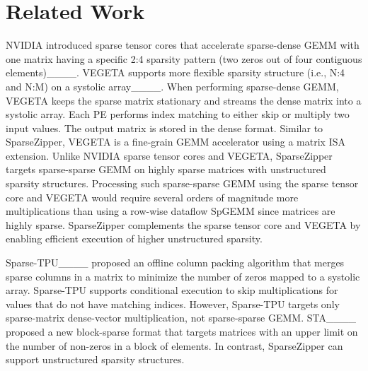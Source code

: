 \section{Related Work}
\label{sec-spz-related-work}

NVIDIA introduced sparse tensor cores that accelerate sparse-dense GEMM with
one matrix having a specific 2:4 sparsity pattern (two zeros out of four
contiguous
elements)____.
VEGETA supports more flexible sparsity structure (i.e., N:4 and N:M) on a
systolic array____.
When performing sparse-dense GEMM, VEGETA keeps the sparse matrix stationary
and streams the dense matrix into a systolic array.
Each PE performs index matching to either skip or multiply two input values.
The output matrix is stored in the dense format.
Similar to SparseZipper, VEGETA is a fine-grain GEMM accelerator using a matrix
ISA extension.
Unlike NVIDIA sparse tensor cores and VEGETA, SparseZipper targets sparse-sparse
GEMM on highly sparse matrices with unstructured sparsity structures.
Processing such sparse-sparse GEMM using the sparse tensor core and VEGETA
would require several orders of magnitude more multiplications than using a
row-wise dataflow SpGEMM since matrices are highly sparse.
SparseZipper complements the sparse tensor core and VEGETA by enabling efficient execution of higher unstructured sparsity.


Sparse-TPU____ proposed an offline column packing
algorithm that merges sparse columns in a matrix to minimize the number of
zeros mapped to a systolic array.
Sparse-TPU supports conditional execution to skip multiplications for values
that do not have matching indices.
However, Sparse-TPU targets only sparse-matrix dense-vector multiplication, not
sparse-sparse GEMM.
STA____ proposed a new block-sparse format that targets
matrices with an upper limit on the number of non-zeros in a block of elements.
In contrast, SparseZipper can support unstructured sparsity structures.

